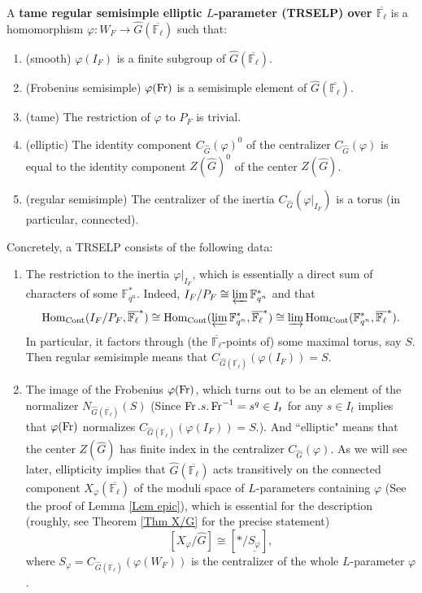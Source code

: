 	\begin{definition}\label{Def TRSELP}
		A \textbf{tame regular semisimple elliptic $L$-parameter (TRSELP) over $\overline{\mathbb{F}_{\ell}}$} is a homomorphism $\varphi: W_F \to \hat{G}(\overline{\mathbb{F}_{\ell}})$ such that:
		\begin{enumerate}
			\item (smooth) $\varphi(I_F)$ is a finite subgroup of $\hat{G}(\overline{\mathbb{F}_{\ell}})$.
			\item (Frobenius semisimple) $\varphi(\operatorname{Fr})$ is a semisimple element of $\hat{G}(\overline{\mathbb{F}_{\ell}})$.
			\item (tame) The restriction of $\varphi$ to $P_F$ is trivial.
			\item \label{elliptic} (elliptic) The identity component $C_{\hat{G}}(\varphi)^0$ of the centralizer $C_{\hat{G}}(\varphi)$ is equal to the identity  component $Z(\hat{G})^0$ of the center $Z(\hat{G})$.
			\item \label{regular semisimple}(regular semisimple) The centralizer of the inertia $C_{\hat{G}}(\varphi|_{I_F})$ is a torus (in particular, connected).
		\end{enumerate}
	\end{definition}

    Concretely, a TRSELP consists of the following data:
    
    \begin{enumerate}
    	\item The restriction to the inertia $\varphi|_{I_F}$, which is essentially a direct sum of characters of some $\mathbb{F}_{q^n}^*$. Indeed, $I_F/P_F \cong \varprojlim\mathbb{F}_{q^n}^*$ and that
    	$$\operatorname{\operatorname{Hom}}_{\operatorname{Cont}}(I_F/P_F, \overline{\mathbb{F}_{\ell}}^*) \cong \operatorname{\operatorname{Hom}}_{\operatorname{Cont}}(\varprojlim\mathbb{F}_{q^n}^*, \overline{\mathbb{F}_{\ell}}^*) \cong \varinjlim\operatorname{\operatorname{Hom}}_{\operatorname{Cont}}(\mathbb{F}_{q^n}^*, \overline{\mathbb{F}_{\ell}}^*).$$
    	In particular, it factors through (the $\overline{\mathbb{F}_{\ell}}$-points of) some maximal torus, say $S$. Then regular semisimple means that $C_{\hat{G}(\overline{\mathbb{F}_{\ell}})}(\varphi(I_F))=S$.
    	\item The image of the Frobenius $\varphi(\operatorname{Fr})$, which turns out to be an element of the normalizer $N_{\hat{G}(\overline{\mathbb{F}_{\ell}})}(S)$ (Since $\operatorname{Fr}.s.\operatorname{Fr}^{-1}=s^q \in I_t$ for any $s \in I_t$ implies that $\varphi(\operatorname{Fr})$ normalizes $C_{\hat{G}(\overline{\mathbb{F}_{\ell}})}(\varphi(I_F))=S$.). 
        And ``elliptic" means that the center $Z(\hat{G})$ has finite index in the centralizer $C_{\hat{G}}(\varphi)$. As we will see later, ellipticity implies that $\hat{G}(\overline{\mathbb{F}_{\ell}})$ acts transitively on the connected component $X_{\varphi}(\overline{\mathbb{F}_{\ell}})$ of the moduli space of $L$-parameters containing $\varphi$ (See the proof of Lemma \ref{Lem epic}), which is essential for the description (roughly, see Theorem \ref{Thm X/G} for the precise statement)
    	$$[X_{\varphi}/\hat{G}] \cong [*/\underline{S_{\varphi}}],$$
    	where $S_\varphi=C_{\hat{G}(\overline{\mathbb{F}_{\ell}})}(\varphi(W_F))$ is the centralizer of the whole $L$-parameter $\varphi$.
    \end{enumerate}


